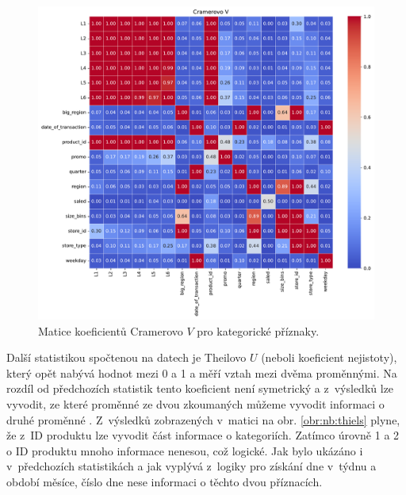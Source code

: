 \begin{figure}[h!]
    \centering
    \includegraphics[width=\textwidth]{obrazky/pripravadat/correlation_matrix_cramers-everything-SFF-stores_targets002.pdf}
    \caption{Matice koeficientů Cramerovo $V$ pro kategorické příznaky.}
    \label{obr:nb:cramers}
\end{figure}

Další statistikou spočtenou na datech je Theilovo $U$ (neboli koeficient nejistoty), který opět nabývá hodnot mezi 0 a 1 a měří vztah mezi dvěma proměnnými. Na rozdíl od předchozích statistik tento koeficient není symetrický a z~výsledků lze vyvodit, ze které proměnné ze dvou zkoumaných můžeme vyvodit informaci o druhé proměnné \cite{bib:correl}. Z~výsledků zobrazených v~matici na obr. \ref*{obr:nb:thiels} plyne, že z~ID produktu lze vyvodit část informace o kategoriích. Zatímco úrovně 1 a 2 o ID produktu mnoho informace nenesou, což logické. Jak bylo ukázáno i v~předchozích statistikách a jak vyplývá z~logiky pro získání dne v~týdnu a období měsíce, číslo dne nese informaci o těchto dvou příznacích.


